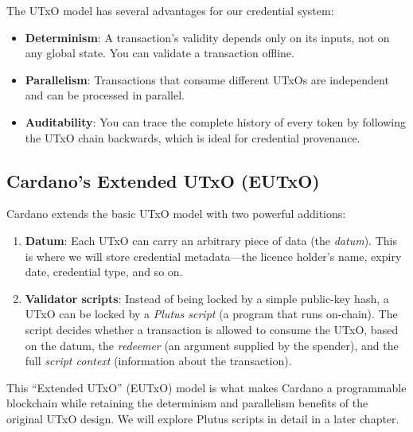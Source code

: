 The UTxO model has several advantages for our credential system:

\begin{itemize}
  \item \textbf{Determinism}: A transaction's validity depends only on its
        inputs, not on any global state.  You can validate a transaction
        offline.
  \item \textbf{Parallelism}: Transactions that consume different UTxOs are
        independent and can be processed in parallel.
  \item \textbf{Auditability}: You can trace the complete history of every
        token by following the UTxO chain backwards, which is ideal for
        credential provenance.
\end{itemize}

\subsection{Cardano's Extended UTxO (EUTxO)}

Cardano extends the basic UTxO model with two powerful additions:

\begin{enumerate}
  \item \textbf{Datum}: Each UTxO can carry an arbitrary piece of data (the
        \emph{datum}).  This is where we will store credential metadata---the
        licence holder's name, expiry date, credential type, and so on.
  \item \textbf{Validator scripts}: Instead of being locked by a simple
        public-key hash, a UTxO can be locked by a \emph{Plutus script} (a
        program that runs on-chain).  The script decides whether a
        transaction is allowed to consume the UTxO, based on the datum, the
        \emph{redeemer} (an argument supplied by the spender), and the full
        \emph{script context} (information about the transaction).
\end{enumerate}

This ``Extended UTxO'' (EUTxO) model is what makes Cardano a programmable
blockchain while retaining the determinism and parallelism benefits of the
original UTxO design.  We will explore Plutus scripts in detail in a later
chapter.

